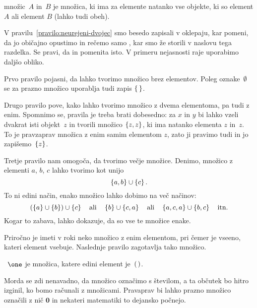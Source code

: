 \begin{pravilo}
  \label{pravilo:unija}
   množic~$A$ in~$B$ je množica, ki ima za elemente
  natanko vse objekte, ki so element $A$ ali element $B$ (lahko tudi obeh).
\end{pravilo}

V pravilu~\ref{pravilo:neurejeni-dvojec} smo besedo  zapisali v oklepaju, kar
pomeni, da jo običajno opustimo in rečemo samo , kar smo že storili v naslovu tega razdelka. Se pravi, da  in  pomenita isto. V primeru nejasnosti raje uporabimo daljšo obliko.

Prvo pravilo pojasni, da lahko tvorimo množico brez elementov.
Poleg oznake~$\emptyset$ se za prazno množico uporablja tudi zapis $\left\{\,\right\}$.

Drugo pravilo pove, kako lahko tvorimo množico z dvema elementoma, pa tudi z enim.
Spomnimo se, pravila je treba brati dobesedno: za $x$ in $y$ bi lahko vzeli dvakrat isti
objekt~$z$ in tvorili množico $\left\{z, z\right\}$, ki ima natanko elementa $z$ in~$z$. To je
pravzaprav množica z enim samim elementom $z$, zato ji pravimo tudi  in jo
zapišemo~$\left\{z\right\}$.

Tretje pravilo nam omogoča, da tvorimo večje množice. Denimo, množico z elementi $a$, $b$,
$c$ lahko tvorimo kot unijo
%
\begin{equation*}
  \left\{a, b\right\} \cup \left\{c\right\}.
\end{equation*}
%
To ni edini način, enako množico lahko dobimo na več načinov:
%
\begin{equation*}
  (\left\{a\right\} \cup \left\{b\right\}) \cup \left\{c\right\}
  \quad\text{ali}\quad
  \left\{b\right\} \cup \left\{c, a\right\}
  \quad\text{ali}\quad
  \left\{a,c,a\right\} \cup \left\{b,c\right\}
  \quad\text{itn.}
\end{equation*}
%
Kogar to zabava, lahko dokazuje, da so vse te množice enake.

Priročno je imeti v roki neko množico z enim elementom, pri čemer je vseeno, kateri element vsebuje.
%
Naslednje pravilo zagotavlja tako množico.

\begin{pravilo}
  \label{pravilo:enojec}
  ~$\one$ je množica, katere edini element je~$(\,)$.
\end{pravilo}

Morda se zdi nenavadno, da množico označimo s številom, a ta občutek bo hitro izginil, ko
bomo računali z množicami. Pravaprav bi lahko prazno množico označili z nič $\mathbf{0}$
in nekateri matematiki to dejansko počnejo.

